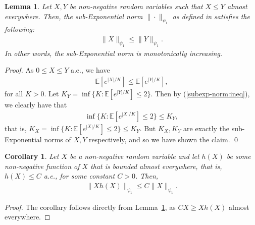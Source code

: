 \documentclass[runningheads]{llncs}
\newtheorem{cor}[theorem]{Corollary}
\newtheorem{lem}[theorem]{Lemma}
\begin{document}
\begin{subappendices}
\begin{lem} \label{lem:mono}
Let $X, Y $ be non-negative random variables such that $X \leq Y$ almost
everywhere. Then, the sub-Exponential norm $\| \cdot \|_{\psi_1}$ as defined in
\cite[Definition 2.8.4] {vershynin2020high} satisfies the following:
\begin{align*}
 \|X\|_{\psi_1} \leq \|Y\|_{\psi_1}.
\end{align*}
In other words, the sub-Exponential norm is monotonically increasing.
\end{lem}
\begin{proof}
    As $0 \leq X \leq Y$ a.e., we have
    \begin{align}\label{subexp-norm:ineq}
    \mathbb{E}\left[e^{|X| /K}\right] \leq \mathbb{E}\left[e^{|Y| /K}\right],
    \end{align}
    for all $K >0$. Let $K_Y = \inf \{ K : \mathbb{E}\left[e^{|Y| /K} \right] \leq
    2\}$.
    Then by (\ref{subexp-norm:ineq}), we clearly have that
    \begin{align*}
      \inf \{ K : \mathbb{E}\left[e^{|X| /K} \right] \leq 2\} \leq K_Y,
    \end{align*}
     that is, $K_X = \inf \{ K : \mathbb{E}\left[e^{|X| /K} \right] \leq 2\} \leq
     K_Y$.
     But $K_X,K_Y$ are exactly the sub-Exponential norms of $X,Y$ respectively,
     and so we have shown the claim.
     \qed
\end{proof}

\begin{cor}\label{cor:subexp-bond}
    Let $X$ be a non-negative random variable and let $h(X)$ be some
    non-negative function of $X$ that is bounded almost everywhere, that is, $h(X)
    \leq C$ a.e., for some constant $C>0$. Then,
    \begin{align*}
      \|Xh(X)\|_{\psi_1} \leq C\|X\|_{\psi_1}.
    \end{align*}
  \end{cor}
  \begin{proof}
The corollary follows directly from Lemma~\ref{lem:mono}, as $CX \geq X h(X)$ almost everywhere.


\end{proof}
\end{subappendices}
\end{document}

